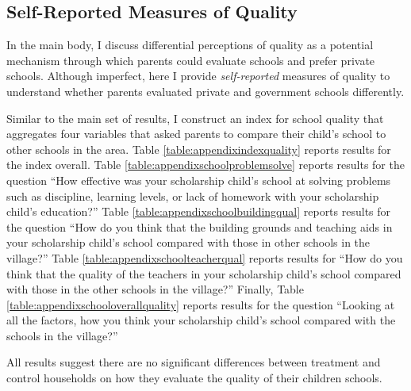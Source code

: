 \documentclass[hidelinks, 12pt, titlepage]{article}
\begin{document}
	\clearpage

	\subsection{Self-Reported Measures of Quality\label{appendix:quality}}

		In the main body, I discuss differential perceptions of quality as a potential mechanism through which parents could evaluate schools and prefer private schools.  Although imperfect, here I provide \emph{self-reported} measures of quality to understand whether parents evaluated private and government schools differently.

		Similar to the main set of results, I construct an index for school quality that aggregates four variables that asked parents to compare their child's school to other schools in the area.  Table \ref{table:appendixindexquality} reports results for the index overall.  Table \ref{table:appendixschoolproblemsolve} reports results for the question ``How effective was your scholarship child's school at solving problems such as discipline, learning levels, or lack of homework with your scholarship child's education?''  Table \ref{table:appendixschoolbuildingqual} reports results for the question ``How do you think that the building grounds and teaching aids in your scholarship child's school compared with those in other schools in the village?''  Table \ref{table:appendixschoolteacherqual} reports results for ``How do you think that the quality of the teachers in your scholarship child's school compared with those in the other schools in the village?''  Finally, Table \ref{table:appendixschooloverallquality} reports results for the question ``Looking at all the factors, how you think your scholarship child's school compared with the schools in the village?''

		All results suggest there are no significant differences between treatment and control households on how they evaluate the quality of their children schools.
\end{document}
